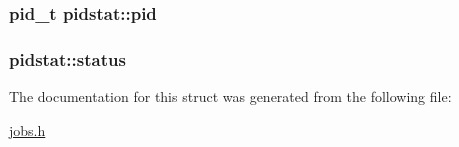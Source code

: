 \subsubsection[{\texorpdfstring{pid}{pid}}]{\setlength{\rightskip}{0pt plus 5cm}pid\+\_\+t pidstat\+::pid}\hypertarget{structpidstat_a9720eaa7788ca953a6130f2b8d1d1a23}{}\label{structpidstat_a9720eaa7788ca953a6130f2b8d1d1a23}
\subsubsection[{\texorpdfstring{status}{status}}]{ pidstat\+::status}\hypertarget{structpidstat_a7feadc8da0ca4c76cd76c3b97274e622}{}\label{structpidstat_a7feadc8da0ca4c76cd76c3b97274e622}


The documentation for this struct was generated from the following file\+:\begin{DoxyCompactItemize}
\item 
\hyperlink{jobs_8h}{jobs.\+h}\end{DoxyCompactItemize}
